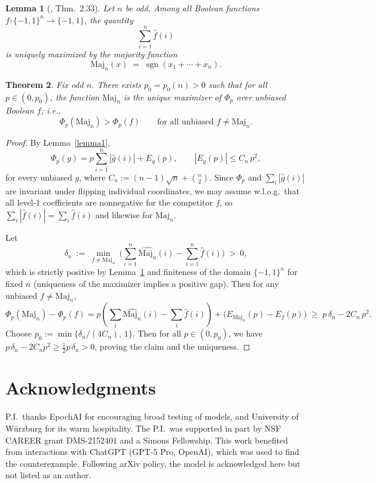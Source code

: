 \documentclass[11pt]{article}
\newtheorem{theorem}{Theorem}
\newtheorem{lemma}[theorem]{Lemma}
\DeclareMathOperator{\sgn}{sgn}
\newcommand{\Maj}{\mathrm{Maj}}
\begin{document}
\begin{lemma}[\cite{ODbook21}, Thm.~2.33]\label{lemma2}
Let $n$ be odd. Among all Boolean functions $f:\{-1,1\}^n\to\{-1,1\}$, the quantity
\[
\sum_{i=1}^n \widehat{f}(i)
\]
is uniquely maximized by the majority function
\[
\Maj_n(x)\;=\;\sgn(x_1+\cdots+x_n).
\]
\end{lemma}

\begin{theorem}
Fix odd $n$. There exists $p_0=p_0(n)>0$ such that for all $p\in(0,p_0)$, the function $\Maj_n$ is the unique maximizer of $\Phi_p$ over unbiased Boolean $f$; i.e.,
\[
\Phi_p(\Maj_n) > \Phi_p(f)\qquad\text{for all unbiased }f\neq \Maj_n.
\]
\end{theorem}

\begin{proof}
By Lemma~\ref{lemma1},
\[
\Phi_p(g)=p\sum_{i=1}^n|\widehat g(i)|+E_g(p),\qquad |E_g(p)|\le C_n\,p^2,
\]
for every unbiased $g$, where $C_n:=(n-1)\sqrt n+\binom{n}{2}$.  
Since $\Phi_p$ and $\sum_i|\hat g(i)|$ are invariant under flipping individual coordinates, we may assume w.l.o.g.\ that all level‑1 coefficients are nonnegative for the competitor $f$, so $\sum_i|\widehat f(i)|=\sum_i\widehat f(i)$ and likewise for $\Maj_n$.

Let
\[
\delta_n\ :=\ \min_{f\ne \Maj_n}\ \Big(\sum_{i=1}^n \widehat{\Maj_n}(i)-\sum_{i=1}^n \widehat f(i)\Big)\ >\ 0,
\]
which is strictly positive by Lemma~\ref{lemma2} and finiteness of the domain \(\{-1,1\}^n\) for fixed \(n\) (uniqueness of the maximizer implies a positive gap). Then for any unbiased \(f\ne \Maj_n\),
\[
\Phi_p(\Maj_n)-\Phi_p(f)
= p\!\left(\sum_i\widehat{\Maj_n}(i)-\sum_i\widehat f(i)\right) + \bigl(E_{\Maj_n}(p)-E_f(p)\bigr)
\;\ge\; p\,\delta_n - 2C_n\,p^2.
\]
Choose \(p_0:=\min\{\delta_n/(4C_n),\,1\}\). Then for all \(p\in(0,p_0)\), we have \(p\,\delta_n-2C_n p^2\ge \tfrac12 p\,\delta_n>0\), proving the claim and the uniqueness.
\end{proof}

\section*{Acknowledgments}
P.I.\ thanks EpochAI for encouraging broad testing of models, and University of W\"urzburg for its warm hospitality. The P.I.\ was supported in part by NSF CAREER grant DMS-2152401 and a Simons Fellowship. This work benefited from interactions with ChatGPT (GPT-5 Pro, OpenAI), which was used to find the counterexample. Following arXiv policy, the model is acknowledged here but not listed as an author.
\end{document}
